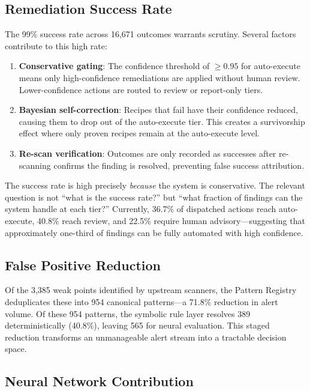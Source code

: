 \documentclass[11pt,a4paper]{article}
\begin{document}
\subsection{Remediation Success Rate}

The 99\% success rate across 16{,}671 outcomes warrants scrutiny. Several factors contribute to this high rate:

\begin{enumerate}[nosep]
  \item \textbf{Conservative gating}: The confidence threshold of $\geq 0.95$ for auto-execute means only high-confidence remediations are applied without human review. Lower-confidence actions are routed to review or report-only tiers.
  \item \textbf{Bayesian self-correction}: Recipes that fail have their confidence reduced, causing them to drop out of the auto-execute tier. This creates a survivorship effect where only proven recipes remain at the auto-execute level.
  \item \textbf{Re-scan verification}: Outcomes are only recorded as successes after re-scanning confirms the finding is resolved, preventing false success attribution.
\end{enumerate}

The success rate is high precisely \emph{because} the system is conservative. The relevant question is not ``what is the success rate?'' but ``what fraction of findings can the system handle at each tier?'' Currently, 36.7\% of dispatched actions reach auto-execute, 40.8\% reach review, and 22.5\% require human advisory---suggesting that approximately one-third of findings can be fully automated with high confidence.

\subsection{False Positive Reduction}

Of the 3{,}385 weak points identified by upstream scanners, the Pattern Registry deduplicates these into 954 canonical patterns---a 71.8\% reduction in alert volume. Of these 954 patterns, the symbolic rule layer resolves 389 deterministically (40.8\%), leaving 565 for neural evaluation. This staged reduction transforms an unmanageable alert stream into a tractable decision space.

\subsection{Neural Network Contribution}
\end{document}
